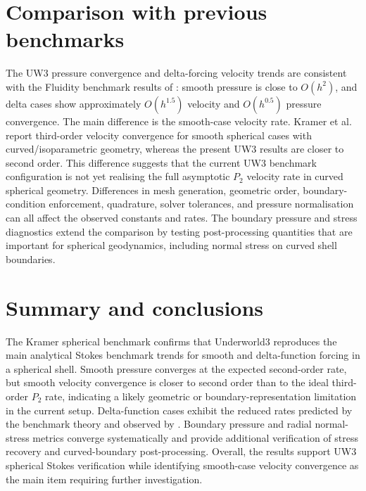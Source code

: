 \documentclass[11pt,a4paper]{article}
\begin{document}
\section{Comparison with previous benchmarks}

The UW3 pressure convergence and delta-forcing velocity trends are consistent with the Fluidity benchmark results of \citet{kramer2021}: smooth pressure is close to \(O(h^2)\), and delta cases show approximately \(O(h^{1.5})\) velocity and \(O(h^{0.5})\) pressure convergence. The main difference is the smooth-case velocity rate. Kramer et al. report third-order velocity convergence for smooth spherical cases with curved/isoparametric geometry, whereas the present UW3 results are closer to second order. This difference suggests that the current UW3 benchmark configuration is not yet realising the full asymptotic \(P_2\) velocity rate in curved spherical geometry. Differences in mesh generation, geometric order, boundary-condition enforcement, quadrature, solver tolerances, and pressure normalisation can all affect the observed constants and rates. The boundary pressure and stress diagnostics extend the comparison by testing post-processing quantities that are important for spherical geodynamics, including normal stress on curved shell boundaries.

\section{Summary and conclusions}

The Kramer spherical benchmark confirms that Underworld3 reproduces the main analytical Stokes benchmark trends for smooth and delta-function forcing in a spherical shell. Smooth pressure converges at the expected second-order rate, but smooth velocity convergence is closer to second order than to the ideal third-order \(P_2\) rate, indicating a likely geometric or boundary-representation limitation in the current setup. Delta-function cases exhibit the reduced rates predicted by the benchmark theory and observed by \citet{kramer2021}. Boundary pressure and radial normal-stress metrics converge systematically and provide additional verification of stress recovery and curved-boundary post-processing. Overall, the results support UW3 spherical Stokes verification while identifying smooth-case velocity convergence as the main item requiring further investigation.



\end{document}
